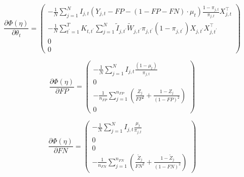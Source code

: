 \documentclass[12pt]{amsart}
\numberwithin{equation}{section}
\theoremstyle{plain}
\begin{document}
$$
\frac{\partial \Phi (\eta)}{\partial \theta_t} =
\left (
\begin{array}{c}
-\frac{1}{N} \sum_{j=1}^N I_{j,t} (Y_{j,t} - FP - (1-FP-FN) \cdot \mu_t) \frac{1-\pi_{j,t}}{\pi_{j,t}} X_{j,t}^\top \\
- \frac{1}{N} \sum_{t^\prime = 1}^T K_{t,t^\prime} \sum_{j = 1}^N \tilde I_{j,t^\prime} \tilde W_{j,t^\prime}  \pi_{j,t^\prime} (1-\pi_{j,t^\prime}) X_{j,t^\prime} X_{j,t^\prime}^\top\\
0 \\
0
\end{array}
\right )
$$

$$
\frac{\partial \Phi (\eta)}{\partial FP} =
\left (
\begin{array}{c}
-\frac{1}{N} \sum_{j=1}^N I_{j,t} \frac{(1-\mu_t)}{\pi_{j,t}} \\
0\\
-\frac{1}{n_{FP}} \sum_{j=1}^{n_{FP}} \left( \frac{Z_j}{FP^2} + \frac{1-Z_j}{(1-FP)^2} \right)  \\
0
\end{array}
\right )
$$

$$
\frac{\partial \Phi (\eta)}{\partial FN} =
\left (
\begin{array}{c}
- \frac{1}{N} \sum_{j=1}^N I_{j,t} \frac{\mu_t}{\pi_{j,t}} \\
0\\
0 \\
-\frac{1}{n_{FN}}  \sum_{j =1}^{n_{FN}} \left( \frac{\tilde Z_j}{FN^2} + \frac{1-\tilde Z_j}{(1-FN)^2} \right)
\end{array}
\right )
$$
\end{document}
